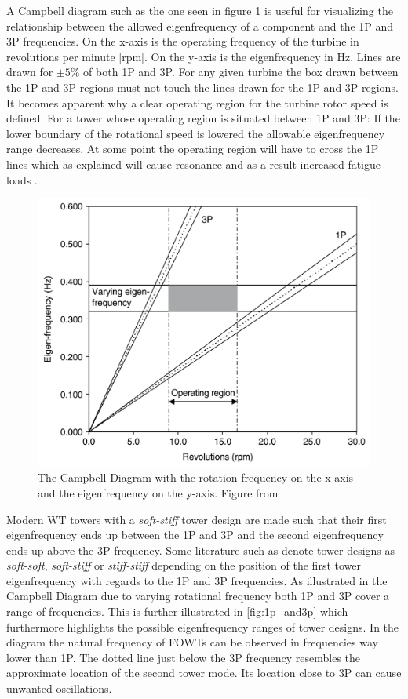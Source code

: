 A Campbell diagram such as the one seen in figure \cref{fig:campbell} is useful for visualizing the relationship between the allowed eigenfrequency of a component and the 1P and 3P frequencies. On the x-axis is the operating frequency of the turbine in revolutions per minute [rpm]. On the y-axis is the eigenfrequency in Hz. Lines are drawn for $ \pm 5 \% $ of both 1P and 3P. For any given turbine the box drawn between the 1P and 3P regions must not touch the lines drawn for the 1P and 3P regions. It becomes apparent why a clear operating region for the turbine rotor speed is defined. For a tower whose operating region is situated between 1P and 3P: If the lower boundary of the rotational speed is lowered the allowable eigenfrequency range decreases. At some point the operating region will have to cross the 1P lines which as explained will cause resonance and as a result increased fatigue loads \cite{Valentine2015}.
\begin{figure}[ht]
	\centering
	\includegraphics[width=0.5\linewidth]{Graphics/CampbellDiagram.PNG}
	\caption{The Campbell Diagram with the rotation frequency on the x-axis and the eigenfrequency on the y-axis. Figure from \cite{Valentine2015}}
	\label{fig:campbell}
\end{figure}
Modern WT towers with a \textit{soft-stiff} tower design are made such that their first eigenfrequency ends up between the 1P and 3P and the second eigenfrequency ends up above the 3P frequency. Some literature such as \cite{Dykes2018} denote tower designs as \textit{soft-soft}, \textit{soft-stiff} or \textit{stiff-stiff} depending on the position of the first tower eigenfrequency with regards to the 1P and 3P frequencies. As illustrated in the Campbell Diagram due to varying rotational frequency both 1P and 3P cover a range of frequencies. This is further illustrated in \cref{fig:1p_and3p} which furthermore highlights the possible eigenfrequency ranges of tower designs. In the diagram the natural frequency of FOWTs can be observed in frequencies way lower than 1P. The dotted line  just below the 3P frequency resembles the approximate location of the second tower mode. Its location close to 3P can cause unwanted oscillations.

